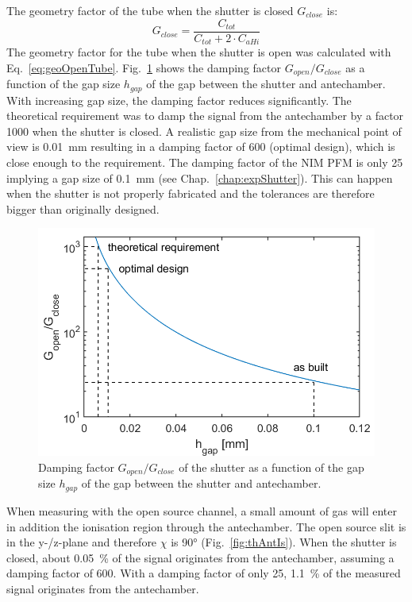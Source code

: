 	The geometry factor of the tube when the shutter is closed $G_{close}$ is:
	\begin{equation}
		G_{close} = \frac{C_{tot}}{C_{tot} + 2\cdot C_{aHi}}
	\end{equation}
	The geometry factor for the tube when the shutter is open was calculated with Eq.~\eqref{eq:geoOpenTube}. Fig.~\ref{fig:ShutGapSizeSigDamp} shows the damping factor $G_{open}/G_{close}$ as a function of the gap size $h_{gap}$ of the gap between the shutter and antechamber. With increasing gap size, the damping factor reduces significantly. The theoretical requirement was to damp the signal from the antechamber by a factor 1000 when the shutter is closed. A realistic gap size from the mechanical point of view is 0.01~mm resulting in a damping factor of 600 (optimal design), which is close enough to the requirement. 
	The damping factor of the NIM PFM is only 25 implying a gap size of 0.1~mm (see Chap.~\ref{chap:expShutter}). This can happen when the shutter is not properly fabricated and the tolerances are therefore bigger than originally designed.\\
		\begin{figure}[h!]
		\centering
		\includegraphics[width=.8\textwidth]{Bilder/Motor_1p2mm.png}
		\caption{Damping factor $G_{open}/G_{close}$ of the shutter as a function of the gap size $h_{gap}$ of the gap between the shutter and antechamber.}
		\label{fig:ShutGapSizeSigDamp}
	\end{figure}
	When measuring with the open source channel, a small amount of gas will enter in addition the ionisation region through the antechamber. The open source slit is in the y-/z-plane and therefore $\chi$ is 90° (Fig.~\ref{fig:thAntIs}). When the shutter is closed, about 0.05~\% of the signal originates from the antechamber, assuming a damping factor of 600. With a damping factor of only 25, 1.1~\% of the measured signal originates from the antechamber. %
	
